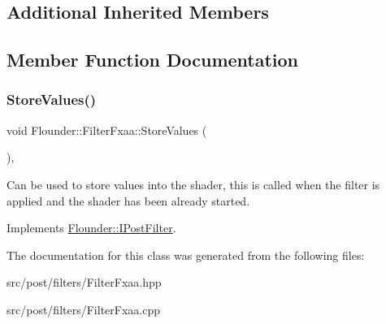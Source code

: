 \subsection*{Additional Inherited Members}


\subsection{Member Function Documentation}
\mbox{\label{class_flounder_1_1_filter_fxaa_a42f51b22b3a521ecdbf7dc9a2eb3ed36}} 
\subsubsection{\texorpdfstring{Store\+Values()}{StoreValues()}}
{\footnotesize\ttfamily void Flounder\+::\+Filter\+Fxaa\+::\+Store\+Values (\begin{DoxyParamCaption}{ }\end{DoxyParamCaption})\hspace{0.3cm}{\ttfamily [override]}, {\ttfamily [virtual]}}



Can be used to store values into the shader, this is called when the filter is applied and the shader has been already started. 



Implements \hyperlink{class_flounder_1_1_i_post_filter_a20420ec0a9bac67437740552bea9ab74}{Flounder\+::\+I\+Post\+Filter}.



The documentation for this class was generated from the following files\+:\begin{DoxyCompactItemize}
\item 
src/post/filters/Filter\+Fxaa.\+hpp\item 
src/post/filters/Filter\+Fxaa.\+cpp\end{DoxyCompactItemize}
